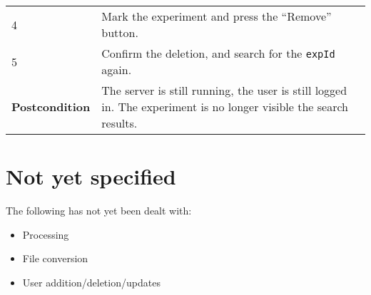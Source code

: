 \begin{longtable}[c]{@{}ll@{}}
\begin{minipage}[t]{0.31\columnwidth}
4
\strut\end{minipage} &
\begin{minipage}[t]{0.63\columnwidth}\raggedright\strut
Mark the experiment and press the ``Remove'' button.
\strut\end{minipage}\tabularnewline
\begin{minipage}[t]{0.31\columnwidth}\raggedright\strut
5
\strut\end{minipage} &
\begin{minipage}[t]{0.63\columnwidth}\raggedright\strut
Confirm the deletion, and search for the \texttt{expId} again.
\strut\end{minipage}\tabularnewline
\begin{minipage}[t]{0.31\columnwidth}\raggedright\strut
\textbf{Postcondition}
\strut\end{minipage} &
\begin{minipage}[t]{0.63\columnwidth}\raggedright\strut
The server is still running, the user is still logged in. The experiment
is no longer visible the search results.
\strut\end{minipage}\tabularnewline
\bottomrule
\end{longtable}

\pagebreak

\section{Not yet specified}\label{not-yet-specified}

The following has not yet been dealt with:

\begin{itemize}
\itemsep1pt\parskip0pt
\item
  Processing
\item
  File conversion
\item
  User addition/deletion/updates
\end{itemize}

